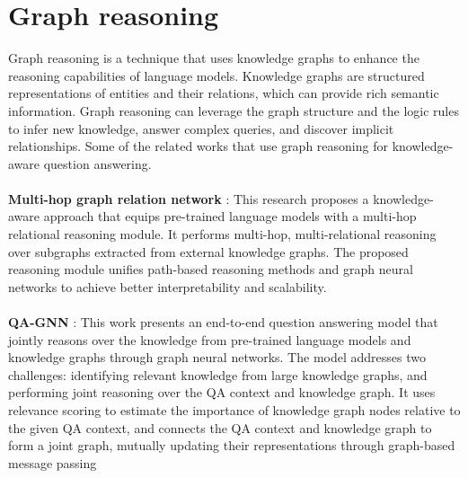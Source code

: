 \section{Graph reasoning}
Graph reasoning is a technique that uses knowledge graphs to enhance the reasoning capabilities of language models. Knowledge graphs are structured representations of entities and their relations, which can provide rich semantic information. Graph reasoning can leverage the graph structure and the logic rules to infer new knowledge, answer complex queries, and discover implicit relationships. Some of the related works that use graph reasoning for knowledge-aware question answering.\\\\
 \textbf{Multi-hop graph relation network} \cite{feng-etal-2020-scalable}: This research proposes a knowledge-aware approach that equips pre-trained language models with a multi-hop relational reasoning module. It performs multi-hop, multi-relational reasoning over subgraphs extracted from external knowledge graphs. The proposed reasoning module unifies path-based reasoning methods and graph neural networks to achieve better interpretability and scalability.\\\\
\textbf{QA-GNN} \cite{yasunaga-etal-2021-qa}: This work presents an end-to-end question answering model that jointly reasons over the knowledge from pre-trained language models and knowledge graphs through graph neural networks. The model addresses two challenges: identifying relevant knowledge from large knowledge graphs, and performing joint reasoning over the QA context and knowledge graph. It uses relevance scoring to estimate the importance of knowledge graph nodes relative to the given QA context, and connects the QA context and knowledge graph to form a joint graph, mutually updating their representations through graph-based message passing